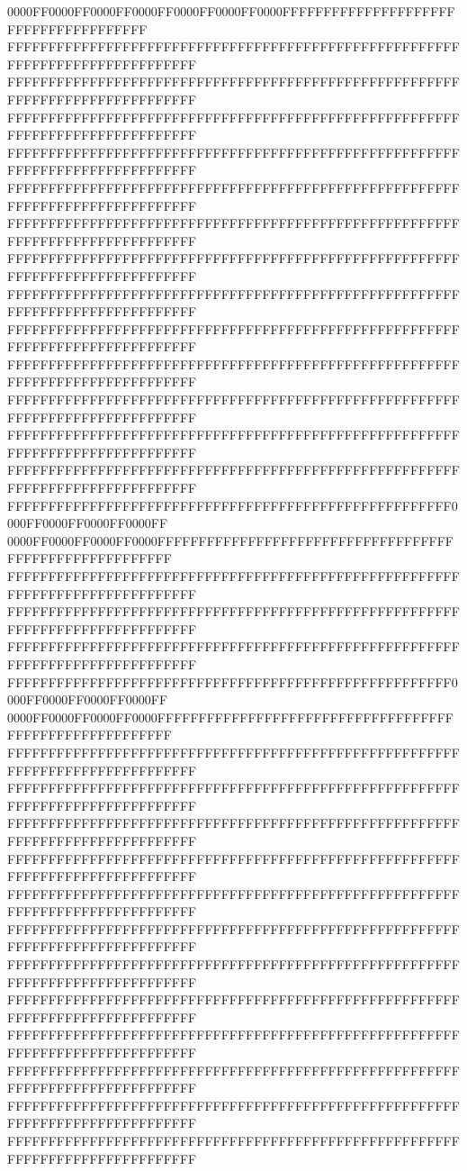 0000FF0000FF0000FF0000FF0000FF0000FF0000FFFFFFFFFFFFFFFFFFFFFFFFFFFFFFFFFFFFFF
FFFFFFFFFFFFFFFFFFFFFFFFFFFFFFFFFFFFFFFFFFFFFFFFFFFFFFFFFFFFFFFFFFFFFFFFFFFFFF
FFFFFFFFFFFFFFFFFFFFFFFFFFFFFFFFFFFFFFFFFFFFFFFFFFFFFFFFFFFFFFFFFFFFFFFFFFFFFF
FFFFFFFFFFFFFFFFFFFFFFFFFFFFFFFFFFFFFFFFFFFFFFFFFFFFFFFFFFFFFFFFFFFFFFFFFFFFFF
FFFFFFFFFFFFFFFFFFFFFFFFFFFFFFFFFFFFFFFFFFFFFFFFFFFFFFFFFFFFFFFFFFFFFFFFFFFFFF
FFFFFFFFFFFFFFFFFFFFFFFFFFFFFFFFFFFFFFFFFFFFFFFFFFFFFFFFFFFFFFFFFFFFFFFFFFFFFF
FFFFFFFFFFFFFFFFFFFFFFFFFFFFFFFFFFFFFFFFFFFFFFFFFFFFFFFFFFFFFFFFFFFFFFFFFFFFFF
FFFFFFFFFFFFFFFFFFFFFFFFFFFFFFFFFFFFFFFFFFFFFFFFFFFFFFFFFFFFFFFFFFFFFFFFFFFFFF
FFFFFFFFFFFFFFFFFFFFFFFFFFFFFFFFFFFFFFFFFFFFFFFFFFFFFFFFFFFFFFFFFFFFFFFFFFFFFF
FFFFFFFFFFFFFFFFFFFFFFFFFFFFFFFFFFFFFFFFFFFFFFFFFFFFFFFFFFFFFFFFFFFFFFFFFFFFFF
FFFFFFFFFFFFFFFFFFFFFFFFFFFFFFFFFFFFFFFFFFFFFFFFFFFFFFFFFFFFFFFFFFFFFFFFFFFFFF
FFFFFFFFFFFFFFFFFFFFFFFFFFFFFFFFFFFFFFFFFFFFFFFFFFFFFFFFFFFFFFFFFFFFFFFFFFFFFF
FFFFFFFFFFFFFFFFFFFFFFFFFFFFFFFFFFFFFFFFFFFFFFFFFFFFFFFFFFFFFFFFFFFFFFFFFFFFFF
FFFFFFFFFFFFFFFFFFFFFFFFFFFFFFFFFFFFFFFFFFFFFFFFFFFFFFFFFFFFFFFFFFFFFFFFFFFFFF
FFFFFFFFFFFFFFFFFFFFFFFFFFFFFFFFFFFFFFFFFFFFFFFFFFFFFF0000FF0000FF0000FF0000FF
0000FF0000FF0000FF0000FFFFFFFFFFFFFFFFFFFFFFFFFFFFFFFFFFFFFFFFFFFFFFFFFFFFFFFF
FFFFFFFFFFFFFFFFFFFFFFFFFFFFFFFFFFFFFFFFFFFFFFFFFFFFFFFFFFFFFFFFFFFFFFFFFFFFFF
FFFFFFFFFFFFFFFFFFFFFFFFFFFFFFFFFFFFFFFFFFFFFFFFFFFFFFFFFFFFFFFFFFFFFFFFFFFFFF
FFFFFFFFFFFFFFFFFFFFFFFFFFFFFFFFFFFFFFFFFFFFFFFFFFFFFFFFFFFFFFFFFFFFFFFFFFFFFF
FFFFFFFFFFFFFFFFFFFFFFFFFFFFFFFFFFFFFFFFFFFFFFFFFFFFFF0000FF0000FF0000FF0000FF
0000FF0000FF0000FF0000FFFFFFFFFFFFFFFFFFFFFFFFFFFFFFFFFFFFFFFFFFFFFFFFFFFFFFFF
FFFFFFFFFFFFFFFFFFFFFFFFFFFFFFFFFFFFFFFFFFFFFFFFFFFFFFFFFFFFFFFFFFFFFFFFFFFFFF
FFFFFFFFFFFFFFFFFFFFFFFFFFFFFFFFFFFFFFFFFFFFFFFFFFFFFFFFFFFFFFFFFFFFFFFFFFFFFF
FFFFFFFFFFFFFFFFFFFFFFFFFFFFFFFFFFFFFFFFFFFFFFFFFFFFFFFFFFFFFFFFFFFFFFFFFFFFFF
FFFFFFFFFFFFFFFFFFFFFFFFFFFFFFFFFFFFFFFFFFFFFFFFFFFFFFFFFFFFFFFFFFFFFFFFFFFFFF
FFFFFFFFFFFFFFFFFFFFFFFFFFFFFFFFFFFFFFFFFFFFFFFFFFFFFFFFFFFFFFFFFFFFFFFFFFFFFF
FFFFFFFFFFFFFFFFFFFFFFFFFFFFFFFFFFFFFFFFFFFFFFFFFFFFFFFFFFFFFFFFFFFFFFFFFFFFFF
FFFFFFFFFFFFFFFFFFFFFFFFFFFFFFFFFFFFFFFFFFFFFFFFFFFFFFFFFFFFFFFFFFFFFFFFFFFFFF
FFFFFFFFFFFFFFFFFFFFFFFFFFFFFFFFFFFFFFFFFFFFFFFFFFFFFFFFFFFFFFFFFFFFFFFFFFFFFF
FFFFFFFFFFFFFFFFFFFFFFFFFFFFFFFFFFFFFFFFFFFFFFFFFFFFFFFFFFFFFFFFFFFFFFFFFFFFFF
FFFFFFFFFFFFFFFFFFFFFFFFFFFFFFFFFFFFFFFFFFFFFFFFFFFFFFFFFFFFFFFFFFFFFFFFFFFFFF
FFFFFFFFFFFFFFFFFFFFFFFFFFFFFFFFFFFFFFFFFFFFFFFFFFFFFFFFFFFFFFFFFFFFFFFFFFFFFF
FFFFFFFFFFFFFFFFFFFFFFFFFFFFFFFFFFFFFFFFFFFFFFFFFFFFFFFFFFFFFFFFFFFFFFFFFFFFFF

